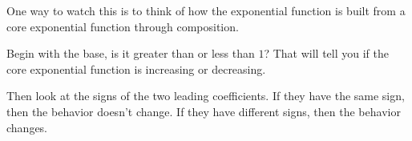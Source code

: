 \documentclass{ximera}
\begin{document}
One way to watch this is to think of how the exponential function is built from a core exponential function through composition.


Begin with the base, is it greater than or less than $1$?  That will tell you if the core exponential function is increasing or decreasing.

Then look at the signs of the two leading coefficients. If they have the same sign, then the behavior doesn't change. If they have different signs, then the behavior changes.
\end{document}
